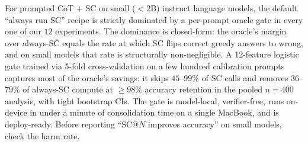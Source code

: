 \documentclass[11pt]{article}
\begin{document}
For prompted CoT + SC on small ($<2$B) instruct language models,
the default ``always run SC'' recipe is strictly dominated by a
per-prompt oracle gate in every
one of our $12$ experiments. The dominance is closed-form: the
oracle's margin over always-SC equals the rate at which SC flips
correct greedy answers to wrong, and on small models that rate is
structurally non-negligible. A 12-feature logistic gate trained
via 5-fold cross-validation on a few hundred calibration prompts
captures most of the oracle's savings: it skips $45$--$99\%$ of
SC calls and removes $36$--$79\%$ of always-SC compute at
$\ge 98\%$ accuracy retention in the pooled $n{=}400$ analysis,
with tight bootstrap CIs. The gate is
model-local, verifier-free, runs on-device in under a minute of
consolidation time on a single MacBook, and is deploy-ready.
Before reporting ``SC@$N$ improves accuracy'' on small models,
check the harm rate.

{\small
\setlength{\bibsep}{2pt}

}
\end{document}

